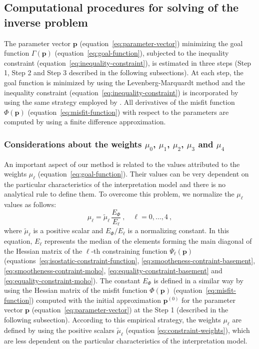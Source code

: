 \documentclass[manuscript,revised]{geophysics}
\begin{document}
\subsection{Computational procedures for solving of the inverse problem}

The parameter vector $\mathbf{p}$ (equation~\ref{eq:parameter-vector}) minimizing the
goal function $\Gamma (\mathbf{p})$ (equation~\ref{eq:goal-function}), subjected to
the inequality constraint (equation~\ref{eq:inequality-constraint}), is estimated 
in three steps (Step 1, Step 2 and Step 3 described in the following subsections). 
At each step, the goal function is minimized by using the Levenberg-Marquardt 
method \citep{silva-etal2001, aster-etal2005} and the inequality constraint 
(equation~\ref{eq:inequality-constraint}) is incorporated by using the same strategy 
employed by \citet{barbosa-etal1999}.
All derivatives of the misfit function $\Phi(\mathbf{p})$ (equation~\ref{eq:misfit-function})
with respect to the parameters are computed by using a finite difference approximation.

\subsubsection{Considerations about the weights $\mu_{0}$, $\mu_{1}$, $\mu_{2}$, $\mu_{3}$ and $\mu_{4}$}

An important aspect of our method is related to the values attributed to 
the weights $\mu_{\ell}$ (equation~\ref{eq:goal-function}).
Their values can be very dependent on the particular characteristics of the 
interpretation model and there is no analytical rule to define them. 
To overcome this problem, we normalize the $\mu_{\ell}$ values as follows:
\begin{equation}
	\mu_{\ell} = \tilde{\mu}_{\ell} \, \frac{E_{\Phi}}{E_{\ell}} \: 
	, \quad \ell = 0, \dots, 4 \: ,
	\label{eq:constraint-weights}
\end{equation}
where $\tilde{\mu}_{\ell}$ is a positive scalar and $E_{\Phi} / E_{\ell}$
is a normalizing constant. In this equation, $E_{\ell}$ represents the median 
of the elements forming the main diagonal of the Hessian matrix of the 
$\ell$-th constraining function $\Psi_{\ell}(\mathbf{p})$ 
(equations~\ref{eq:isostatic-constraint-function}, 
\ref{eq:smootheness-contraint-basement}, \ref{eq:smootheness-contraint-moho}, 
\ref{eq:equality-constraint-basement} and 
\ref{eq:equality-constraint-moho}). The constant $E_{\Phi}$ is defined in 
a similar way by using the Hessian matrix of the misfit function $\Phi(\mathbf{p})$ 
(equation~\ref{eq:misfit-function}) computed with 
the initial approximation $\mathbf{p}^{(0)}$ for the parameter vector $\mathbf{p}$ 
(equation~\ref{eq:parameter-vector}) at the Step 1 (described in the following subsection).
According to this empirical strategy, the weights $\mu_{\ell}$ are defined 
by using the positive scalars $\tilde{\mu}_{\ell}$ 
(equation \ref{eq:constraint-weights}), which are less dependent on the particular 
characteristics of the interpretation model.
\end{document}
